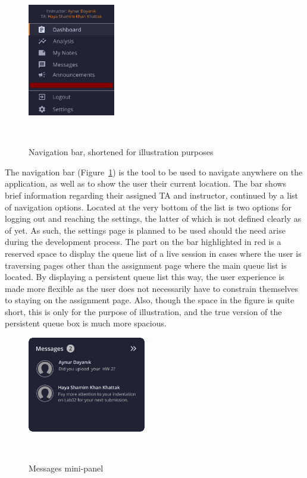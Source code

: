 \documentclass[a4paper, 12pt]{article}
\begin{document}
    \begin{figure}
        \centering
        \vspace{-15pt}
        \includegraphics[width=0.34\textwidth]{navbar_short}
        \caption{Navigation bar, shortened for illustration purposes}~\label{fig:navbar_short}
    \end{figure}
    
    The navigation bar (Figure~\ref{fig:navbar_short}) is the tool to be used to navigate
    anywhere on the application, as well as to show the user their current location. The bar shows brief information regarding
    their assigned TA and instructor, continued by a list of navigation options. Located at the very bottom of the list is two
    options for logging out and reaching the settings, the latter of which is not defined clearly as of yet. As such, the settings
    page is planned to be used should the need arise during the development process. The part on the bar highlighted in red is 
    a reserved space to display the queue list of a live session in cases where the user is traversing pages other than the assignment page
    where the main queue list is located. By displaying a persistent queue list this way, the user experience is made more flexible as
    the user does not necessarily have to constrain themselves to staying on the assignment page. Also, though the space in the figure
    is quite short, this is only for the purpose of illustration, and the true version of the persistent queue box is much more spacious.
    
    \begin{figure}
        \centering
        \vspace{-15pt}
        \includegraphics[width=0.46\textwidth]{messages_panel}
        \caption{Messages mini-panel}~\label{fig:messages_panel}
    \end{figure}
    
\end{document}
